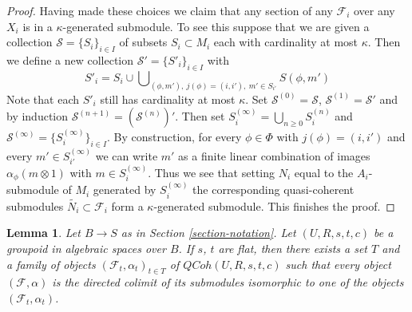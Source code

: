 \documentclass{stacks-project}
\theoremstyle{plain}
\newtheorem{lemma}[subsection]{Lemma}
\theoremstyle{definition}
\theoremstyle{remark}
\numberwithin{equation}{subsection}
\def\QCoh{\mathit{QCoh}}
\begin{document}
\begin{proof}
\medskip\noindent
Having made these choices we claim that any section of any $\mathcal{F}_i$
over any $X_i$ is in a $\kappa$-generated submodule. To see this suppose
that we are given a collection $\mathcal{S} = \{S_i\}_{i \in I}$ of subsets
$S_i \subset M_i$ each with cardinality at most $\kappa$. Then we define
a new collection $\mathcal{S}' = \{S'_i\}_{i \in I}$ with
$$
S'_i = S_i \cup
\bigcup\nolimits_{(\phi, m'),\ j(\phi) = (i, i'),\ m' \in S_{i'}} S(\phi, m')
$$
Note that each $S'_i$ still has cardinality at most $\kappa$.
Set $\mathcal{S}^{(0)} = \mathcal{S}$,
$\mathcal{S}^{(1)} = \mathcal{S}'$ and by induction
$\mathcal{S}^{(n + 1)} = (\mathcal{S}^{(n)})'$. Then set
$S_i^{(\infty)} = \bigcup_{n \geq 0} S_i^{(n)}$ and
$\mathcal{S}^{(\infty)} = \{S_i^{(\infty)}\}_{i \in I}$.
By construction, for every $\phi \in \Phi$ with $j(\phi) = (i, i')$
and every $m' \in S^{(\infty)}_{i'}$ we can write $m'$
as a finite linear combination of images $\alpha_\phi(m \otimes 1)$
with $m \in S_i^{(\infty)}$. Thus we see that setting $N_i$ equal
to the $A_i$-submodule of $M_i$ generated by $S_i^{(\infty)}$
the corresponding quasi-coherent submodules
$\widetilde{N_i} \subset \mathcal{F}_i$ form a $\kappa$-generated submodule.
This finishes the proof.
\end{proof}

\begin{lemma}
\label{lemma-set-generators}
Let $B \to S$ as in Section \ref{section-notation}.
Let $(U, R, s, t, c)$ be a groupoid in algebraic spaces over $B$.
If $s$, $t$ are flat, then there exists a set $T$ and a family of objects
$(\mathcal{F}_t, \alpha_t)_{t \in T}$ of $\QCoh(U, R, s, t, c)$
such that every object $(\mathcal{F}, \alpha)$ is the directed colimit
of its submodules isomorphic to one of the objects $(\mathcal{F}_t, \alpha_t)$.
\end{lemma}
\end{document}
